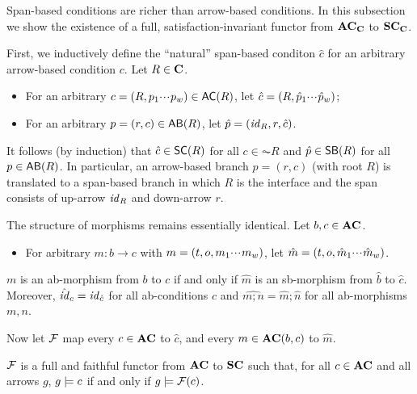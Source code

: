 Span-based conditions are richer than arrow-based conditions. In this subsection we show the existence of a full, satisfaction-invariant functor from $\mathbf{AC}_{\mathbf{C}}$ to $\mathbf{SC}_{\mathbf{C}}$.

First, we inductively define the ``natural'' span-based conditon $\hat c$ for an arbitrary arrow-based condition $c$. Let $R\in\mathbf{C}$.
\begin{itemize}
\item For an arbitrary $c=(R,p_1\ccdots p_w)\in \AC R$, let $\hat c=(R,\hat p_1{\cdotp\mkern-2mu\cdotp\mkern-2mu\cdotp\mkern1mu} \hat p_w)$; 
\item For an arbitrary $p=(r,c)\in \AB R$, let $\hat p=(\mathit{id}_R,r,\hat c)$.
\end{itemize}
%
It follows (by induction) that $\hat c\in \SC R$ for all $c\in \AC R$ and $\hat p\in \SB R$ for all $p\in \AB R$. In particular, an arrow-based branch $p=(r,c)$ (with root $R$) is translated to a span-based branch in which $R$ is the interface and the span consists of up-arrow $\mathit{id}_R$ and down-arrow $r$.

The structure of morphisms remains essentially identical. Let $b,c\in \mathbf{AC}$.
%
\begin{itemize}
\item For arbitrary $m:b\to c$ with $m=(t,o,m_1{\cdotp\mkern-2mu\cdotp\mkern-2mu\cdotp\mkern1mu} m_w)$, let $\hat m=(t,o,\hat m_1{\cdotp\mkern-2mu\cdotp\mkern-2mu\cdotp\mkern1mu} \hat m_w)$.
\end{itemize}
%
\begin{proposition}
$m$ is an ab-morphism from $b$ to $c$ if and only if $\hat m$ is an sb-morphism from $\hat b$ to $\hat c$. Moreover, $\hat {\mathit{id}}_c=\mathit{id}_{\hat c}$ for all ab-conditions $c$ and $\widehat{m;n}=\hat m;\hat n$ for all ab-morphisms $m,n$.
\end{proposition}
%
Now let $\mathcal{F}$ map every $c\in \mathbf{AC}$ to $\hat c$, and every $m\in \mathbf{AC}(b,c)$ to $\hat m$.

\begin{theorem}
$\mathcal{F}$ is a full and faithful functor from $\mathbf{AC}$ to $\mathbf{SC}$ such that, for all $c\in \mathbf{AC}$ and all arrows $g$, $g\models c$ if and only if $g\models \mathcal{F}(c)$.
\end{theorem}




